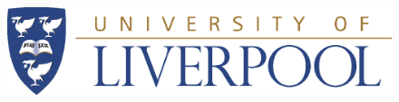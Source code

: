 \begin{titlepage}
\begin{center}

\vspace*{.06\textheight}
\vspace{1cm}
{\scshape\LARGE \univname\par} %
\vspace{0.8cm}


\begin{figure}[ht]
    \centering
    \includegraphics[width=\textwidth]{Figures/Logos/UoLlogo.eps}
\end{figure}

\HRule \\[0.4cm] %
{\huge \bfseries \ttitle\par}\vspace{0.4cm} %
\HRule \\[1cm] %


\vspace{1cm}


\end{center}
\end{titlepage}

